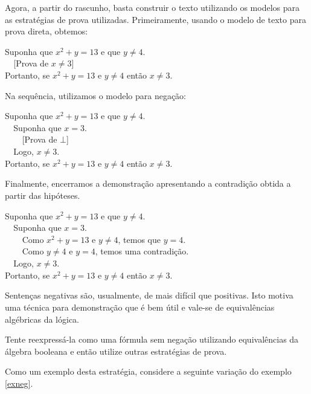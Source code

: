 \begin{Example}
Agora, a partir do rascunho, basta construir o texto utilizando os
modelos para as estratégias de prova utilizadas. Primeiramente, usando
o modelo de texto para prova direta, obtemos:
\begin{flushleft}
Suponha que $x^2 + y = 13$ e que $y \neq 4$.\\
\verb|  |[Prova de $x\neq 3$]\\
Portanto, se $x^2 + y = 13$ e $y \neq 4$ então $x \neq 3$.
\end{flushleft}
Na sequência, utilizamos o modelo para negação:
\begin{flushleft}
Suponha que $x^2 + y = 13$ e que $y \neq 4$.\\
\verb|  |Suponha que $x = 3$.\\
\verb|    |[Prova de $\bot$]\\
\verb|  |Logo, $x\neq 3$.\\
Portanto, se $x^2 + y = 13$ e $y \neq 4$ então $x \neq 3$.
\end{flushleft}
Finalmente, encerramos a demonstração apresentando a contradição
obtida a partir das hipóteses.
\begin{flushleft}
Suponha que $x^2 + y = 13$ e que $y \neq 4$.\\
\verb|  |Suponha que $x = 3$.\\
\verb|    |Como $x^2 + y = 13$ e $y\neq 4$, temos que $y = 4$.\\
\verb|    |Como $y \neq 4$ e $y = 4$, temos uma contradição.\\
\verb|  |Logo, $x\neq 3$.\\
Portanto, se $x^2 + y = 13$ e $y \neq 4$ então $x \neq 3$.
\end{flushleft}
\end{Example}
Sentenças negativas são, usualmente, de mais difícil que
positivas. Isto motiva uma técnica para demonstração que é bem útil e
vale-se de equivalências algébricas da lógica.
\begin{ProofStrategy}\label{neg2}
Tente reexpressá-la como uma fórmula sem negação utilizando
equivalências da álgebra booleana e então utilize outras estratégias de prova.
\end{ProofStrategy}
Como um exemplo desta estratégia, considere a seguinte variação do
exemplo \ref{exneg}.
